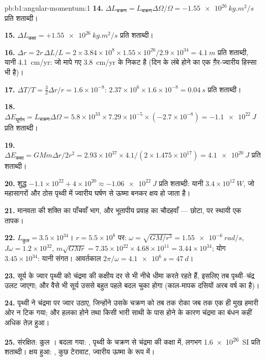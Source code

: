 \begin{solution}{pb:b1:angular-momentum:1}
\textbf{14.} $\Delta L_{\text{चक्रण}} = L_{\text{चक्रण}}\Delta\Omega/\Omega =
\qty{-1.55e26}{kg.m^2/s}$ प्रति शताब्दी।

\textbf{15.} $\Delta L_{\text{कक्षा}} = +\qty{1.55e26}{kg.m^2/s}$ प्रति शताब्दी।

\textbf{16.} $\Delta r = 2r\,\Delta L/L = 2 \times 3.84\times10^8 \times 1.55
\times10^{26}/2.9\times10^{34} = \qty{4.1}{m}$ प्रति शताब्दी, यानी \qty{4.1}{cm/yr}:
जो मापे गए \qty{3.8}{cm/yr} के निकट है (दिन के लंबे होने का एक ग़ैर-ज्वारीय
हिस्सा भी है)।

\textbf{17.} $\Delta T/T = \tfrac32\Delta r/r = 1.6\times10^{-8}$: $2.37\times
10^6 \times 1.6\times10^{-8} = \qty{0.04}{s}$ प्रति शताब्दी।

\textbf{18.} $\Delta E_{\text{घूर्णन}} = L_{\text{चक्रण}}\Delta\Omega = 5.8\times10^{33}
\times 7.29\times10^{-5} \times (-2.7\times10^{-8}) = \qty{-1.1e22}{J}$ प्रति
शताब्दी।

\textbf{19.} $\Delta E_{\text{कक्षा}} = GMm\Delta r/2r^2 = 2.93\times10^{37}
\times 4.1/(2 \times 1.475\times10^{17}) = \qty{+4.1e20}{J}$ प्रति शताब्दी।

\textbf{20.} शुद्ध $-1.1\times10^{22} + 4\times10^{20} \approx \qty{-1.06e22}{J}$
प्रति शताब्दी: यानी $3.4\times10^{12}\ \unit{W}$, जो महासागरों और ठोस पृथ्वी
में ज्वारीय घर्षण से ऊष्मा बनकर क्षय हो जाता है।

\textbf{21.} मानवता की शक्ति का पाँचवाँ भाग, और भूतापीय प्रवाह का चौदहवाँ
--- छोटा, पर स्थायी एक तापक।

\textbf{22.} $L_{\text{कुल}} = 3.5\times10^{34}$। $r = 5.5\times10^8$ पर:
$\omega = \sqrt{GM/r^3} = \qty{1.55e-6}{rad/s}$, $J\omega = 1.2\times10^{32}$,
$m\sqrt{GMr} = 7.35\times10^{22} \times 4.68\times10^{11} = 3.44\times10^{34}$;
योग $3.45\times10^{34}$: यानी संगत। आवर्तकाल $2\pi/\omega = \qty{4.1e6}{s}
= \qty{47}{d}$।

\textbf{23.} सूर्य के ज्वार पृथ्वी को चंद्रमा की कक्षीय दर से भी नीचे धीमा
करते रहते हैं, इसलिए तब पृथ्वी--चंद्र  उलट जाएगा; और वैसे भी सूर्य
उससे बहुत पहले बदल चुका होगा (काल-मापक दसियों अरब वर्ष का है)।

\textbf{24.} पृथ्वी ने चंद्रमा पर ज्वार उठाए, जिन्होंने उसके चक्रण को तब
तक रोका जब तक एक ही मुख हमारी ओर न टिक गया; और हलका होने तथा किसी भारी
साथी के पास होने के कारण चंद्रमा का बंधन कहीं अधिक तेज़ हुआ।

\textbf{25.} संरक्षित: कुल । बदला गया: , पृथ्वी के
चक्रण से चंद्रमा की कक्षा में, लगभग \qty{1.6e26}{SI}
प्रति शताब्दी। क्षय हुआ: , कुछ टेरावाट, ज्वारीय ऊष्मा के
रूप में।
\end{solution}
